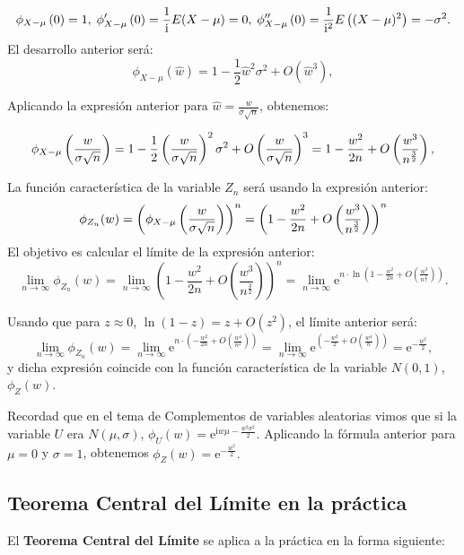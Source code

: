 \documentclass[]{book}
\begin{document}
\[
\scriptsize{
\phi_{X-\mu}\left(0\right)=1, \ \phi_{X-\mu}'\left(0\right)=\frac{1}{\mathrm{i}}E(X-\mu)=0,\ \phi_{X-\mu}''\left(0\right)=\frac{1}{\mathrm{i}^2}E\left((X-\mu)^2\right)=-\sigma^2.
}
\]
El desarrollo anterior será:
\[
\phi_{X-\mu}\left(\hat{w}\right) =1 - \frac{1}{2}\hat{w}^2\sigma^2+O(\hat{w}^3),
\]

Aplicando la expresión anterior para \(\hat{w}=\frac{w}{\sigma\sqrt{n}}\), obtenemos:

\[
\scriptsize{
\phi_{X-\mu}\left(\frac{w}{\sigma\sqrt{n}}\right) =1 - \frac{1}{2}\left(\frac{w}{\sigma\sqrt{n}}\right)^2\sigma^2+O\left(\frac{w}{\sigma\sqrt{n}}\right)^3= 1-\frac{w^2}{2n}+O\left(\frac{w^3}{n^{\frac{3}{2}}}\right),
}
\]

La función característica de la variable \(Z_n\) será usando la expresión anterior:
\[
\scriptsize{\phi_{Z_n}(w)=\left(\phi_{X-\mu}\left(\frac{w}{\sigma\sqrt{n}}\right)\right)^n = \left(1-\frac{w^2}{2n}+O\left(\frac{w^3}{n^{\frac{3}{2}}}\right)\right)^n}
\]
El objetivo es calcular el límite de la expresión anterior:
\[
\lim_{n\to \infty}\phi_{Z_n}(w) = \lim_{n\to\infty} \left(1-\frac{w^2}{2n}+O\left(\frac{w^3}{n^{\frac{3}{2}}}\right)\right)^n = 
\lim_{n\to \infty}\mathrm{e}^{n\cdot \ln \left(1-\frac{w^2}{2n}+O\left(\frac{w^3}{n^{\frac{3}{2}}}\right)\right)}.
\]

Usando que para \(z\approx 0\), \(\ln(1-z)=z+O(z^2)\), el límite anterior será:
\[
\lim_{n\to \infty}\phi_{Z_n}(w) = 
\lim_{n\to \infty}\mathrm{e}^{n\cdot \left(-\frac{w^2}{2n}+O\left(\frac{w^4}{n^{2}}\right)\right)} = \lim_{n\to \infty}\mathrm{e}^{ \left(-\frac{w^2}{2}+O\left(\frac{w^4}{n}\right)\right)} = \mathrm{e}^{-\frac{w^2}{2}},
\]
y dicha expresión coincide con la función característica de la variable \(N(0,1)\), \(\phi_{Z}(w)\).

Recordad que en el tema de Complementos de variables aleatorias vimos que si la variable \(U\) era \(N(\mu,\sigma)\), \(\phi_{U}(w)=\mathrm{e}^{\mathrm{i}w\mu-\frac{w^2\sigma^2}{2}}\). Aplicando la fórmula anterior para \(\mu=0\) y \(\sigma=1\), obtenemos \(\phi_{Z}(w)=\mathrm{e}^{-\frac{w^2}{2}}.\)

\hypertarget{teorema-central-del-luxedmite-en-la-pruxe1ctica}{%
\subsection{Teorema Central del Límite en la práctica}\label{teorema-central-del-luxedmite-en-la-pruxe1ctica}}

El \textbf{Teorema Central del Límite} se aplica a la práctica en la forma siguiente:
\end{document}
